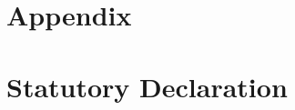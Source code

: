 \documentclass[11pt, a4paper]{article} %
\makeatletter
\theoremstyle{definition}
\newcommand{\signature}[2][5cm]{%
  \begin{tabular}{@{}p{#1}@{}}
    #2 \\[2\normalbaselineskip] \hrule \\[0pt]
    {\small \textit{Signature}} \\[2\normalbaselineskip] \hrule \\[0pt]
    {\small \textit{Place, Date}}
  \end{tabular}
}
\makeatother
\begin{document}
\newpage %
\section*{Appendix} %


\newpage %
\thispagestyle{empty} %
\section*{Statutory Declaration} %

\vspace*{1in} %




\end{document}
